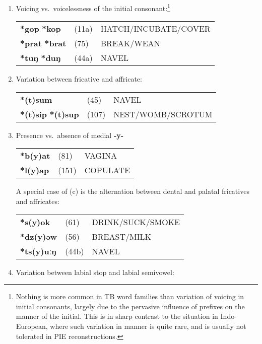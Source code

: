 \begin{enumerate}
\item %
Voicing vs.\ voicelessness of the initial consonant:\footnote{Nothing is
more common in TB word families than variation of voicing in initial consonants,
largely due to the pervasive influence of prefixes on the manner of the initial.
 This is in sharp contrast to the situation in Indo-European, where such
variation in manner is quite rare, and is usually not tolerated in PIE
reconstructions.}\nopagebreak[4]

\begin{tabular}{lll}
\textbf{*gop} \STEDTU{⪤} \textbf{*kop}	&(11a)	&HATCH/INCUBATE/COVER\\
\textbf{*prat} \STEDTU{⪤} \textbf{*brat}	&(75)	&BREAK/WEAN\\
\textbf{*tuŋ} \STEDTU{⪤} \textbf{*duŋ}	&(44a)	&NAVEL\\
\end{tabular}

\item %
Variation between fricative and affricate:

\begin{tabular}{lll}
\textbf{*(t)sum}	&(45)		&NAVEL\\
\textbf{*(t)sip} \STEDTU{⪤} \textbf{*(t)sup} &(107)	&NEST/WOMB/SCROTUM\footnotemark\\
\end{tabular}

\item %
Presence vs.\ absence of medial \textbf{-y-}

\begin{tabular}{lll}
\textbf{*b(y)at}	&(81)		&VAGINA\\
\textbf{*l(y)ap}	&(151)		&COPULATE\\
\end{tabular}

A special case of (c) is the alternation between dental and palatal fricatives
and affricates:

\begin{tabular}{lll}
\textbf{*s(y)ok}	&(61)		&DRINK/SUCK/SMOKE\\
\textbf{*dz(y)əw}	&(56)		&BREAST/MILK\\
\textbf{*ts(y)uːŋ}	&(44b)		&NAVEL\\
\end{tabular}

\item %
Variation between labial stop and labial semivowel:


\end{enumerate}
